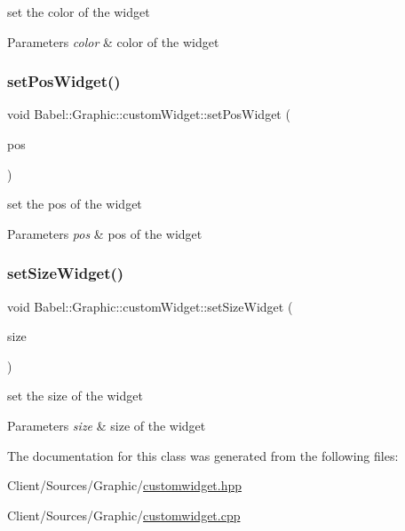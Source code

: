 set the color of the widget 
\begin{DoxyParams}{Parameters}
{\em color} & color of the widget \\
\hline
\end{DoxyParams}
\mbox{\label{classBabel_1_1Graphic_1_1customWidget_ad9abc40a0d4346e00a433d4f5694c39c}} 
\subsubsection{\texorpdfstring{set\+Pos\+Widget()}{setPosWidget()}}
{\footnotesize\ttfamily void Babel\+::\+Graphic\+::custom\+Widget\+::set\+Pos\+Widget (\begin{DoxyParamCaption}\item[{Q\+Pair$<$ qint32, qint32 $>$}]{pos }\end{DoxyParamCaption})}

set the pos of the widget 
\begin{DoxyParams}{Parameters}
{\em pos} & pos of the widget \\
\hline
\end{DoxyParams}
\mbox{\label{classBabel_1_1Graphic_1_1customWidget_a47e9f116a1a90aae19f60bf1fa559146}} 
\subsubsection{\texorpdfstring{set\+Size\+Widget()}{setSizeWidget()}}
{\footnotesize\ttfamily void Babel\+::\+Graphic\+::custom\+Widget\+::set\+Size\+Widget (\begin{DoxyParamCaption}\item[{Q\+Pair$<$ qint32, qint32 $>$}]{size }\end{DoxyParamCaption})}

set the size of the widget 
\begin{DoxyParams}{Parameters}
{\em size} & size of the widget \\
\hline
\end{DoxyParams}


The documentation for this class was generated from the following files\+:\begin{DoxyCompactItemize}
\item 
Client/\+Sources/\+Graphic/\hyperlink{customwidget_8hpp}{customwidget.\+hpp}\item 
Client/\+Sources/\+Graphic/\hyperlink{customwidget_8cpp}{customwidget.\+cpp}\end{DoxyCompactItemize}
